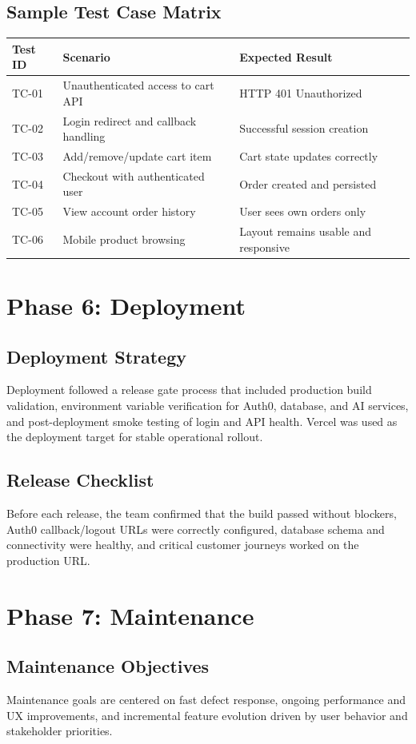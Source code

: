 \documentclass[12pt,a4paper]{article}
\begin{document}
\subsection{Sample Test Case Matrix}
\begin{tabular}{p{} p{} p{}}
\toprule
\textbf{Test ID} & \textbf{Scenario} & \textbf{Expected Result} \\
\midrule
TC-01 & Unauthenticated access to cart API & HTTP 401 Unauthorized \\
TC-02 & Login redirect and callback handling & Successful session creation \\
TC-03 & Add/remove/update cart item & Cart state updates correctly \\
TC-04 & Checkout with authenticated user & Order created and persisted \\
TC-05 & View account order history & User sees own orders only \\
TC-06 & Mobile product browsing & Layout remains usable and responsive \\
\bottomrule
\end{tabular}

\section{Phase 6: Deployment}
\subsection{Deployment Strategy}
Deployment followed a release gate process that included production build validation, environment variable verification for Auth0, database, and AI services, and post-deployment smoke testing of login and API health. Vercel was used as the deployment target for stable operational rollout.

\subsection{Release Checklist}
Before each release, the team confirmed that the build passed without blockers, Auth0 callback/logout URLs were correctly configured, database schema and connectivity were healthy, and critical customer journeys worked on the production URL.

\section{Phase 7: Maintenance}
\subsection{Maintenance Objectives}
Maintenance goals are centered on fast defect response, ongoing performance and UX improvements, and incremental feature evolution driven by user behavior and stakeholder priorities.
\end{document}
